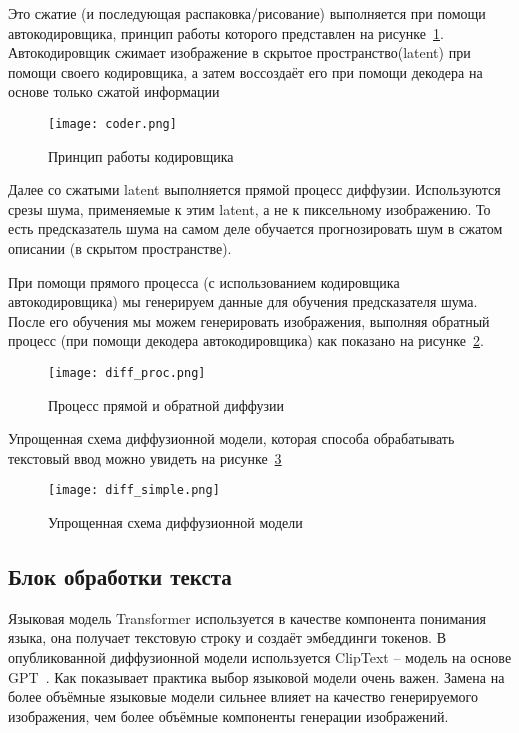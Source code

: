 Это сжатие (и последующая распаковка/рисование) выполняется при помощи автокодировщика, принцип работы которого представлен на рисунке~\ref{func::coder}. Автокодировщик сжимает изображение в скрытое пространство(latent) при помощи своего кодировщика, а затем воссоздаёт его при помощи декодера на основе только сжатой информации

\begin{figure}[ht]
    \centering
    \texttt{[image: coder.png]}
    \caption{Принцип работы кодировщика}
    \label{func::coder}
\end{figure}

Далее со сжатыми latent выполняется прямой процесс диффузии. Используются срезы шума, применяемые к этим latent, а не к пиксельному изображению. То есть предсказатель шума на самом деле обучается прогнозировать шум в сжатом описании (в скрытом пространстве).

При помощи прямого процесса (с использованием кодировщика автокодировщика) мы генерируем данные для обучения предсказателя шума. После его обучения мы можем генерировать изображения, выполняя обратный процесс (при помощи декодера автокодировщика) как показано на рисунке~\ref{func::diff_proc}.

\begin{figure}[ht]
    \centering
    \texttt{[image: diff\_proc.png]}
    \caption{Процесс прямой и обратной диффузии}
    \label{func::diff_proc}
\end{figure}

Упрощенная схема диффузионной модели, которая способа обрабатывать текстовый ввод можно увидеть на рисунке~\ref{func::diff_simple}

\begin{figure}[ht]
    \centering
    \texttt{[image: diff\_simple.png]}
    \caption{Упрощенная схема диффузионной модели}
    \label{func::diff_simple}
\end{figure}

\subsection{Блок обработки текста}

Языковая модель Transformer используется в качестве компонента понимания языка, она получает текстовую строку и создаёт эмбеддинги токенов. В опубликованной диффузионной модели используется ClipText – модель на основе GPT~\cite{gpt}. Как показывает практика выбор языковой модели очень важен. Замена на более объёмные языковые модели сильнее влияет на качество генерируемого изображения, чем более объёмные компоненты генерации изображений.

